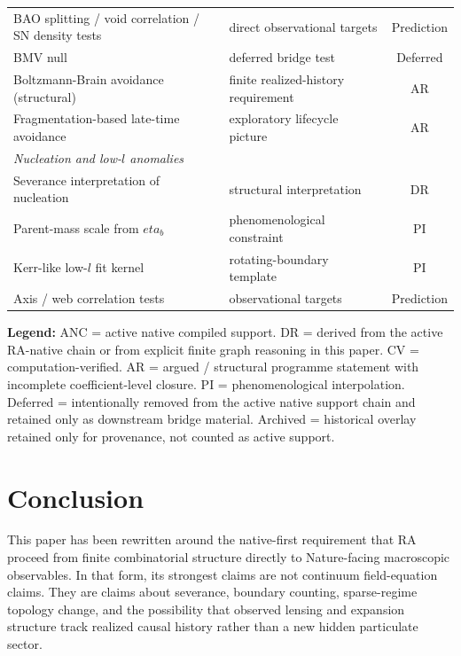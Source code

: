\documentclass[11pt]{article}
\def\ell{l}%
\def\eta{eta}%
\begin{document}
\begin{center}
\begin{tabular}{llc}
BAO splitting / void correlation / SN density tests & direct observational targets & Prediction \\
BMV null & deferred bridge test & Deferred \\
Boltzmann-Brain avoidance (structural) & finite realized-history requirement & AR \\
Fragmentation-based late-time avoidance & exploratory lifecycle picture & AR \\
\midrule
\multicolumn{3}{l}{\textit{Nucleation and low-$\ell$ anomalies}} \\
Severance interpretation of nucleation & structural interpretation & DR \\
Parent-mass scale from $\eta_b$ & phenomenological constraint & PI \\
Kerr-like low-$\ell$ fit kernel & rotating-boundary template & PI \\
Axis / web correlation tests & observational targets & Prediction \\
\bottomrule
\end{tabular}
\end{center}

\textbf{Legend:} ANC = active native compiled support. DR = derived from the active RA-native chain or from explicit finite graph reasoning in this paper. CV = computation-verified. AR = argued / structural programme statement with incomplete coefficient-level closure. PI = phenomenological interpolation. Deferred = intentionally removed from the active native support chain and retained only as downstream bridge material. Archived = historical overlay retained only for provenance, not counted as active support.

\section{Conclusion}
\label{sec:conclusion}

This paper has been rewritten around the native-first requirement that RA proceed from finite combinatorial structure directly to Nature-facing macroscopic observables. In that form, its strongest claims are not continuum field-equation claims. They are claims about severance, boundary counting, sparse-regime topology change, and the possibility that observed lensing and expansion structure track realized causal history rather than a new hidden particulate sector.
\end{document}
